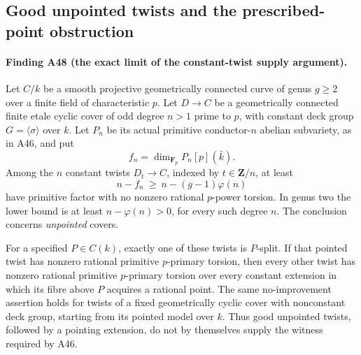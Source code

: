 \subsection{Good unpointed twists and the prescribed-point obstruction}
\label{sec:twists-pointing-obstruction}

\paragraph{Finding A48 (the exact limit of the constant-twist supply argument).}
Let $C/k$ be a smooth projective geometrically connected curve of
genus $g\ge2$ over a finite field of characteristic $p$.
Let $D\to C$ be a geometrically connected finite etale cyclic
cover of odd degree $n>1$ prime to $p$, with constant deck group
$G=\langle\sigma\rangle$ over $k$. Let $P_n$ be its actual
primitive conductor-$n$ abelian subvariety, as in A46, and put
\[
                       f_n=\dim_{\mathbf F_p}P_n[p](\bar k).
\]
Among the $n$ constant twists $D_t\to C$, indexed by
$t\in\mathbf Z/n$, at least
\[
                n-f_n\ \ge\ n-(g-1)\varphi(n)
 \tag{TW.1}
\]
have primitive factor with no nonzero rational $p$-power
torsion. In genus two the lower bound is at least
$n-\varphi(n)>0$, for every such degree $n$.
The conclusion concerns \emph{unpointed} covers.

For a specified $P\in C(k)$, exactly one of these twists is
$P$-split. If that pointed twist has nonzero rational primitive
$p$-primary torsion, then every other twist has nonzero rational
primitive $p$-primary torsion over every constant extension in
which its fibre above $P$ acquires a rational point.
The same no-improvement assertion holds for twists of a fixed
geometrically cyclic cover with nonconstant deck group, starting
from its pointed model over $k$.
Thus good unpointed twists, followed by a pointing extension,
do not by themselves supply the witness required by A46.

